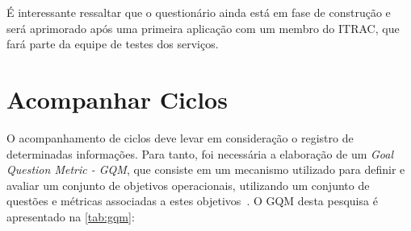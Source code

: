 É interessante ressaltar que o questionário ainda está em fase de construção e será aprimorado após uma primeira aplicação com um membro do ITRAC, que fará parte da equipe de testes dos serviços.

\section{Acompanhar Ciclos}
\label{sec:acompanhar_ciclos}

O acompanhamento de ciclos deve levar em consideração o registro de determinadas informações. Para tanto, foi necessária a elaboração de um \textit{Goal Question Metric - GQM}, que consiste em um mecanismo utilizado para definir e avaliar um conjunto de objetivos operacionais, utilizando um conjunto de questões e métricas associadas a estes objetivos~\cite{basili1994goal}. O GQM desta pesquisa é apresentado na \ref{tab:gqm}:

